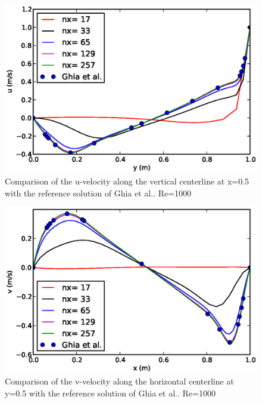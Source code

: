 \begin{figure}[H]
\centering
\includegraphics[scale=0.8]{"figs/uvel_1000"}
\caption{Comparison of the u-velocity along the vertical centerline at x=0.5 with the reference solution of Ghia et al.. Re=1000}
\label{fig:cavity_1000_u}
\end{figure}
%
\begin{figure}[H]
\centering
\includegraphics[scale=0.8]{"figs/vvel_1000"}
\caption{Comparison of the v-velocity along the horizontal centerline at y=0.5 with the reference solution of Ghia et al.. Re=1000}
\label{fig:cavity_1000_v}
\end{figure}
